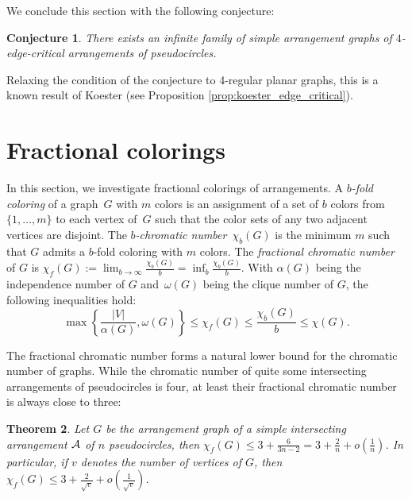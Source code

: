 \documentclass[fontsize=11pt,a4paper,DIV12]{scrartcl}
\newtheorem{theorem}{Theorem}
\newtheorem{conjecture}[theorem]{Conjecture}
\def\AA{{\cal A}}
\begin{document}
We conclude this section with the following conjecture:

\begin{conjecture}\label{conj:pentagon}
  There exists an infinite family of simple arrangement graphs of $4$-edge-critical arrangements of pseudocircles.
\end{conjecture}

Relaxing the condition of the conjecture to 4-regular planar graphs, this is a known result of Koester (see Proposition  \ref{prop:koester_edge_critical}).


\section{Fractional colorings}
\label{sec:fractional}

In this section, we investigate fractional colorings of arrangements. A
\emph{$b$-fold coloring} of a graph~$G$ with $m$ colors is an assignment of a
set of $b$ colors from $\{1,\ldots,m\}$ to each vertex of~$G$ such that the
color sets of any two adjacent vertices are disjoint.  The \emph{$b$-chromatic
  number}~$\chi_b(G)$ is the minimum $m$ such that $G$ admits a $b$-fold
coloring with $m$ colors. The \emph{fractional chromatic number} of $G$ is
$\chi_f(G) := {\displaystyle \lim_{b \to \infty}}\frac{\chi_b(G)}{b} =
{\displaystyle \inf_{b}} \frac{\chi_b(G)}{b}$.  With $\alpha(G)$ being the
independence number of $G$ and~$\omega(G)$ being the clique number of $G$, the following
inequalities hold:
\begin{equation}
\label{equation:alpha-chi-relation}
\max \left\{\frac{|V|}{\alpha(G)},\omega(G) \right\} \le \chi_f(G)
\le \frac{\chi_b(G)}{b} \le \chi(G).
\end{equation}

The fractional chromatic number forms a natural lower bound for the chromatic
number of graphs. While the chromatic number of quite some intersecting arrangements of
pseudocircles is four, at least their fractional chromatic number is always close to three:

\begin{theorem} \label{theorem:chifrac_3_2n}
  Let $G$ be the arrangement graph
  of a simple intersecting arrangement $\AA$ of $n$ pseudocircles, then
  $\chi_f (G)\le 3+\frac{6}{3n-2} = 3+\frac{2}{n}+o\left(\frac{1}{n}\right)$.  In
  particular, if $v$ denotes the number of vertices of $G$, then
  $\chi_f(G) \le 3+\frac{2}{\sqrt{v}}+o\left(\frac{1}{\sqrt{v}}\right)$.
\end{theorem}
\end{document}
